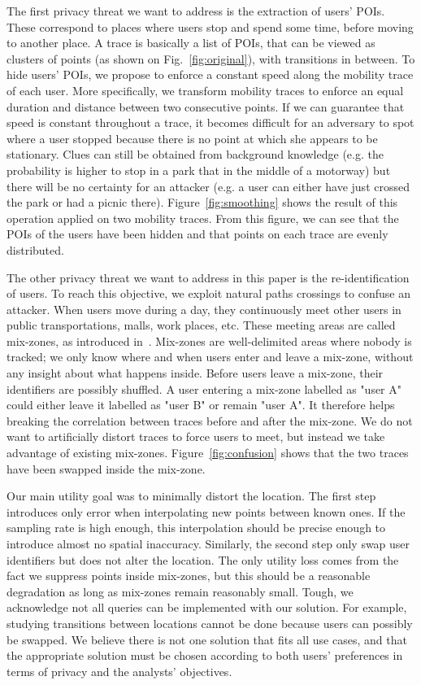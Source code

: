 \documentclass[10,conference,compsocconf]{IEEEtran}
\begin{document}
The first privacy threat we want to address is the extraction of users' POIs.
These correspond to places where users stop and spend some time, before moving to another place.
A trace is basically a list of POIs, that can be viewed as clusters of points (as shown on Fig.~\ref{fig:original}), with transitions in between.
To hide users' POIs, we propose to enforce a constant speed along the mobility trace of each user.
More specifically, we transform mobility traces to enforce an equal duration and distance between two consecutive points.
If we can guarantee that speed is constant throughout a trace, it becomes difficult for an adversary to spot where a user stopped because there is no point at which she appears to be stationary.
Clues can still be obtained from background knowledge (e.g. the probability is higher to stop in a park that in the middle of a motorway) but there will be no certainty for an attacker (e.g. a user can either have just crossed the park or had a picnic there).
Figure~\ref{fig:smoothing} shows the result of this operation applied on two mobility traces.
From this figure, we can see that the POIs of the users have been hidden and that points on each trace are evenly distributed.

The other privacy threat we want to address in this paper is the re-identification of users.
To reach this objective, we exploit natural paths crossings to confuse an attacker. 
When users move during a day, they continuously meet other users in public transportations, malls, work places, etc.
These meeting areas are called mix-zones, as introduced in~\cite{Beresford03}.
Mix-zones are well-delimited areas where nobody is tracked; we only know where and when users enter and leave a mix-zone, without any insight about what happens inside.
Before users leave a mix-zone, their identifiers are possibly shuffled.
A user entering a mix-zone labelled as "user A" could either leave it labelled as "user B" or remain "user A".
It therefore helps breaking the correlation between traces before and after the mix-zone.
We do not want to artificially distort traces to force users to meet, but instead we take advantage of existing mix-zones.
Figure~\ref{fig:confusion} shows that the two traces have been swapped inside the mix-zone.

Our main utility goal was to minimally distort the location.
The first step introduces only error when interpolating new points between known ones.
If the sampling rate is high enough, this interpolation should be precise enough to introduce almost no spatial inaccuracy.
Similarly, the second step only swap user identifiers but does not alter the location.
The only utility loss comes from the fact we suppress points inside mix-zones, but this should be a reasonable degradation as long as mix-zones remain reasonably small.
Tough, we acknowledge not all queries can be implemented with our solution.
For example, studying transitions between locations cannot be done because users can possibly be swapped.
We believe there is not one solution that fits all use cases, and that the appropriate solution must be chosen according to both users' preferences in terms of privacy and the analysts' objectives.
\end{document}
